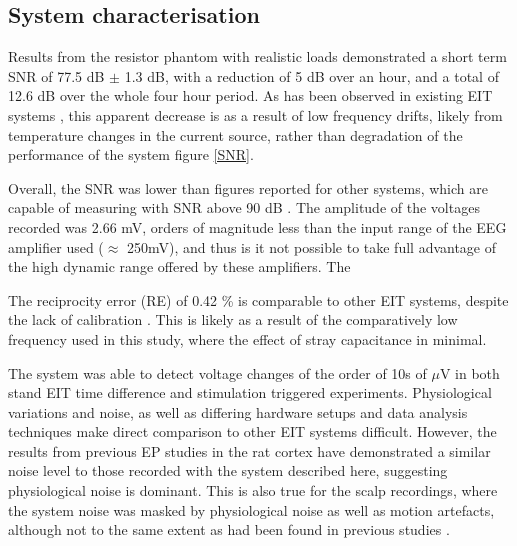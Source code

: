 \subsection{System characterisation}
Results from the resistor phantom with realistic loads demonstrated a short term SNR of 77.5 dB $\pm$ 1.3 dB, with a reduction of 5 dB over an hour, and a total of 12.6 dB over the whole four hour period. As has  been observed in existing EIT systems \cite{oh2007multi}, this apparent decrease is as a result of low frequency drifts, likely from temperature changes in the current source, rather than degradation of the performance of the system figure \ref{SNR}. 

Overall, the SNR was lower than figures reported for other systems, which are capable of measuring with SNR above 90 dB \cite{khan,Hun_Wi_2014}. The amplitude of the voltages recorded was 2.66 mV, orders of magnitude less than the input range of the EEG amplifier used ($\approx$ 250mV), and thus is it not possible to take full advantage of the high dynamic range offered by these amplifiers. The 

The reciprocity error (RE) of 0.42 \% is comparable to other EIT systems, despite the lack of calibration \cite{oh2007multi,Hun_Wi_2014,khan}. This is likely as a result of the comparatively low frequency used in this study, where the effect of stray capacitance in minimal.  








The system was able to detect voltage changes of the order of 10s of $\mu$V in both stand EIT time difference and stimulation triggered experiments. Physiological variations and noise, as well as differing hardware setups and data analysis techniques make direct comparison to other EIT systems difficult. However, the results from previous EP studies \cite{Oh2011} in the rat cortex have demonstrated a similar noise level to those recorded with the system described here, suggesting physiological noise is dominant. This is also true for the scalp recordings, where the system noise was masked by physiological noise as well as motion artefacts, although not to the same extent as had been found in previous studies \cite{Fabrizi_2006}. 

